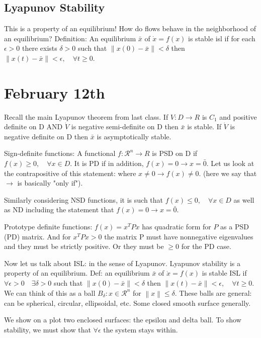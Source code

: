 \documentclass[11pt]{article}
\newcommand{\norm}[1]{\left\lVert#1\right\rVert}
\begin{document}
\subsection*{Lyapunov Stability}
This is a property of an equilibrium! How do flows behave in the neighborhood of an equilibrium? Definition: An equilibrium $\bar{x}$ of $\dot{x} = f(x)$ is stable isl if for each $\epsilon > 0$ there exists $\delta >0$ such that $\norm{x(0) - \bar{x}} < \delta$ then $\norm{ x(t) - \bar{x}} < \epsilon,\quad \forall t \geq 0$.




\section*{February 12th}
Recall the main Lyapunov theorem from last class. If $V:D\rightarrow R$ is $C_1$
and positive definite on D AND $\dot{V}$ is negative semi-definite on D then $\bar{x}$ is stable. If $\dot{V}$ is negative definite on D then $\bar{x}$ is asymptotically stable.

 Sign-definite functions: A functional $f:\mathcal{R}^n \rightarrow R$ is PSD on D if $f(x)\geq 0, \quad \forall x \in D$. It is PD if in addition, $f(x)=0 \rightarrow x = \bar{0}$. Let us look at the contrapositive of this statement: where $x \neq 0 \rightarrow f(x) \neq 0$. (here we say that $\rightarrow$ is basically "only  if").

 Similarly considering NSD functions, it is such that $f(x) \leq 0, \quad \forall x \in D$ as well as ND including the statement that $f(x)=0 \rightarrow x = \bar{0}$.

 Prototype definite functions: $f(x) = x^TPx$ has quadratic form for $P$ as a PSD (PD) matrix. And for $x^TPx > 0$ the matrix P must have nonnegative eigenvalues and they must be strictly positive. Or they must be $\geq 0$ for the PD case. 


 Now let us talk about ISL: in the sense of Lyapunov. Lyapunov stability is a property of an equilibrium. Def: an equilibrium $\bar{x}$ of $\dot{x}=f(x)$ is stable ISL if $\forall \epsilon >0 \quad \exists \delta >0$ such that $\norm{x(0) - \bar{x}} < \delta$ then $\norm{ x(t) - \bar{x}} < \epsilon,\quad \forall t \geq 0$. We can think of this as a ball $B_\delta: x\in \mathcal{R}^n$ for $\norm{x}\leq \delta$. These balls are general: can be spherical, circular, ellipsoidal, etc. Some closed smooth surface generally. 

 We show on a plot two enclosed surfaces: the epsilon and delta ball. To show stability, we must show that $\forall \epsilon$ the system stays within.
\end{document}
